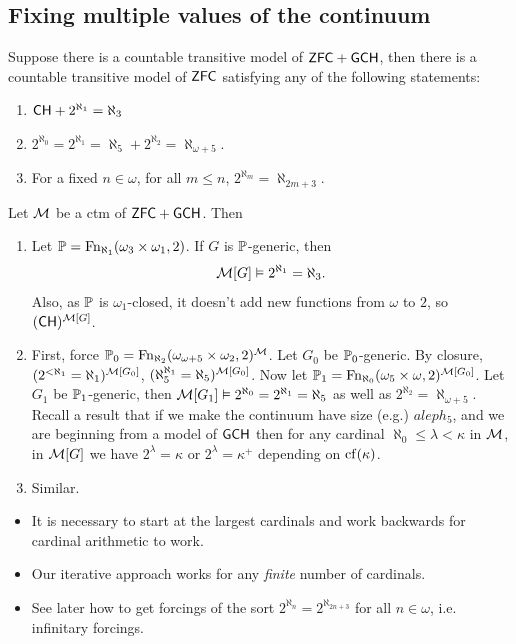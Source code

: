 \documentclass{article}
\begin{document}
    \subsection{Fixing multiple values of the continuum}
    \begin{fancythm}{}
        Suppose there is a countable transitive model of $\mathsf{ZFC} + \mathsf{GCH}$, then there is a countable transitive model of $\mathsf{ZFC}$ satisfying any of the following statements: \begin{enumerate}
            \item[(i)] $\mathsf{CH} + 2^{\aleph_{1}}=\aleph_{3}$
            \item[(ii)] $2^{\aleph_{0}}=2^{\aleph_{1}}=\aleph_{5} + 2^{\aleph_{2}}=\aleph_{\omega+5}$.
            \item[(iii)] For a fixed $n \in \omega$, for all $m \leq n$, $2^{\aleph_{m}}=\aleph_{2m+3}$.
        \end{enumerate}
    \end{fancythm}
    \proof Let $\mathcal{M}$ be a ctm of $\mathsf{ZFC} + \mathsf{GCH}$. Then \begin{enumerate}
        \item[(i)] Let $\mathbb{P} = \operatorname{Fn}_{\aleph_{1}}(\omega_{3} \times \omega_{1},2)$. If $G$ is $\mathbb{P}$-generic, then \[ \mathcal{M}[G] \vDash 2^{\aleph_{1}}=\aleph_{3}.\] Also, as $\mathbb{P}$ is $\omega_{1}$-closed, it doesn't add new functions from $\omega$ to $2$, so $(\mathsf{CH})^{\mathcal{M}[G]}$.
        \item[(ii)] First, force $\mathbb{P}_{0} = \operatorname{Fn}_{\aleph_{2}}(\omega_{\omega+5} \times \omega_{2}, 2)^{\mathcal{M}}$. Let $G_{0}$ be $\mathbb{P}_{0}$-generic. By closure, $(2^{<\aleph_{1}} = \aleph_{1})^{\mathcal{M}[G_{0}]}$, $(\aleph_{5}^{\aleph_{1}}=\aleph_{5})^{\mathcal{M}[G_{0}]}$. Now let $\mathbb{P}_{1} = \operatorname{Fn}_{\aleph_{0}}(\omega_{5} \times \omega, 2)^{\mathcal{M}[G_{0}]}$. Let $G_{1}$ be $\mathbb{P}_{1}$-generic, then $\mathcal{M}[G_{1}] \vDash 2^{\aleph_{0}}=2^{\aleph_{1}} =\aleph_{5}$ as well as $2^{\aleph_{2}}=\aleph_{\omega+5}$. Recall a result that if we make the continuum have size (e.g.) $aleph_{5}$, and we are beginning from a model of $\mathsf{GCH}$ then for any cardinal $ \aleph_{0} \leq \lambda <\kappa$ in $\mathcal{M}$, in $\mathcal{M}[G]$ we have $2^{\lambda} = \kappa$ or $2^{\lambda}=\kappa^{+}$ depending on $\operatorname{cf}(\kappa)$.
        \item[(iii)] Similar.
    \end{enumerate}
    \endproof
    \begin{remark*}\hspace{0.1cm}
        \begin{itemize}
            \item It is necessary to start at the largest cardinals and work backwards for cardinal arithmetic to work.
            \item Our iterative approach works for any \textit{finite} number of cardinals.
            \item  See later how to get forcings of the sort $2^{\aleph_{n}}=2^{\aleph_{2n+3}}$ for all $n \in \omega$, i.e. infinitary forcings.
        \end{itemize}
    \end{remark*}
\end{document}
